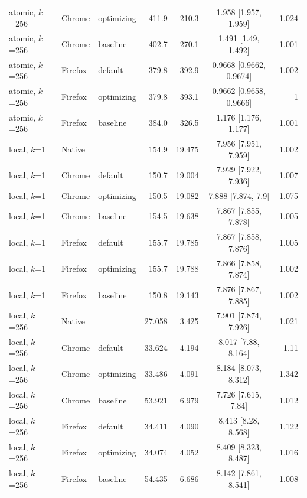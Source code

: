 {\begin{longtable}{lllrrcr}
atomic, $k$=256 & Chrome & optimizing & 411.9 & 210.3 & 1.958 [1.957, 1.959] & 1.024 \\
atomic, $k$=256 & Chrome & baseline & 402.7 & 270.1 & 1.491 [1.49, 1.492] & 1.001 \\
atomic, $k$=256 & Firefox & default & 379.8 & 392.9 & 0.9668 [0.9662, 0.9674] & 1.002 \\
atomic, $k$=256 & Firefox & optimizing & 379.8 & 393.1 & 0.9662 [0.9658, 0.9666] & 1 \\
atomic, $k$=256 & Firefox & baseline & 384.0 & 326.5 & 1.176 [1.176, 1.177] & 1.001 \\
\midrule
local, $k$=1 & Native &  & 154.9 & 19.475 & 7.956 [7.951, 7.959] & 1.002 \\
local, $k$=1 & Chrome & default & 150.7 & 19.004 & 7.929 [7.922, 7.936] & 1.007 \\
local, $k$=1 & Chrome & optimizing & 150.5 & 19.082 & 7.888 [7.874, 7.9] & 1.075 \\
local, $k$=1 & Chrome & baseline & 154.5 & 19.638 & 7.867 [7.855, 7.878] & 1.005 \\
local, $k$=1 & Firefox & default & 155.7 & 19.785 & 7.867 [7.858, 7.876] & 1.005 \\
local, $k$=1 & Firefox & optimizing & 155.7 & 19.788 & 7.866 [7.858, 7.874] & 1.002 \\
local, $k$=1 & Firefox & baseline & 150.8 & 19.143 & 7.876 [7.867, 7.885] & 1.002 \\
\midrule
local, $k$=256 & Native &  & 27.058 & 3.425 & 7.901 [7.874, 7.926] & 1.021 \\
local, $k$=256 & Chrome & default & 33.624 & 4.194 & 8.017 [7.88, 8.164] & 1.11 \\
local, $k$=256 & Chrome & optimizing & 33.486 & 4.091 & 8.184 [8.073, 8.312] & 1.342 \\
local, $k$=256 & Chrome & baseline & 53.921 & 6.979 & 7.726 [7.615, 7.84] & 1.012 \\
local, $k$=256 & Firefox & default & 34.411 & 4.090 & 8.413 [8.28, 8.568] & 1.122 \\
local, $k$=256 & Firefox & optimizing & 34.074 & 4.052 & 8.409 [8.323, 8.487] & 1.016 \\
local, $k$=256 & Firefox & baseline & 54.435 & 6.686 & 8.142 [7.861, 8.541] & 1.008 \\
\end{longtable}
}
